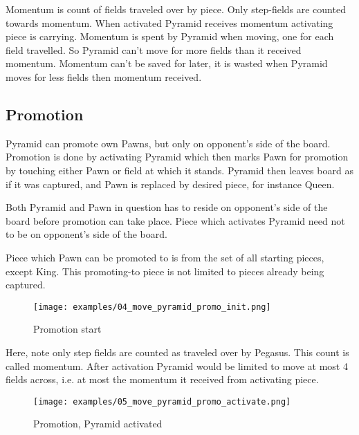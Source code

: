 
Momentum is count of fields traveled over by piece. Only step-fields are
counted towards momentum. When activated Pyramid receives momentum activating
piece is carrying. Momentum is spent by Pyramid when moving, one for each field
travelled. So Pyramid can't move for more fields than it received momentum.
Momentum can't be saved for later, it is wasted when Pyramid moves for less
fields then momentum received.

\clearpage

\subsection*{Promotion}

Pyramid can promote own Pawns, but only on opponent's side of the board.
Promotion is done by activating Pyramid which then marks Pawn for promotion
by touching either Pawn or field at which it stands. Pyramid then leaves
board as if it was captured, and Pawn is replaced by desired piece, for
instance Queen.

Both Pyramid and Pawn in question has to reside on opponent's side of the
board before promotion can take place. Piece which activates Pyramid need
not to be on opponent's side of the board.

Piece which Pawn can be promoted to is from the set of all starting pieces,
except King. This promoting-to piece is not limited to pieces already being
captured.

\clearpage

\noindent
\begin{figure}[!h]
\texttt{[image: examples/04\_move\_pyramid\_promo\_init.png]}
\caption{Promotion start}
\label{fig:ma_promo_init}
\end{figure}

Here, note only step fields are counted as traveled over by Pegasus. This
count is called momentum. After activation Pyramid would be limited to move
at most 4 fields across, i.e. at most the momentum it received from activating
piece.

\clearpage

\noindent
\begin{figure}[!h]
\texttt{[image: examples/05\_move\_pyramid\_promo\_activate.png]}
\caption{Promotion, Pyramid activated}
\label{fig:ma_promo_activate}
\end{figure}

